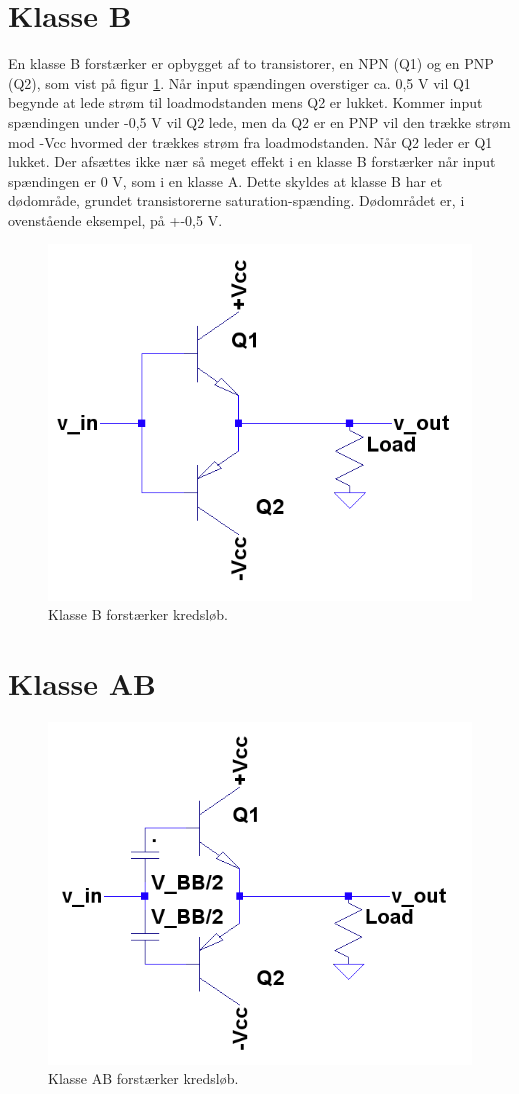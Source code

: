 \section{Klasse B}
En klasse B forstærker er opbygget af to transistorer, en NPN (Q1) og en PNP (Q2), som vist på figur \ref{fig:classb}. Når input spændingen overstiger ca. 0,5 V vil Q1 begynde at lede strøm til loadmodstanden mens Q2 er lukket. Kommer input spændingen under -0,5 V vil Q2 lede, men da Q2 er en PNP vil den trække strøm mod -Vcc hvormed der trækkes strøm fra loadmodstanden. Når Q2 leder er Q1 lukket. 
Der afsættes ikke nær så meget effekt i en klasse B forstærker når input spændingen er 0 V, som i en klasse A. Dette skyldes at klasse B har et dødområde, grundet transistorerne saturation-spænding. Dødområdet er, i ovenstående eksempel, på +-0,5 V. 

\begin{figure}[h]
\centering
\includegraphics[scale=.6]{klasser/classb.png}
\caption{Klasse B forstærker kredsløb.}
\label{fig:classb}
\end{figure}

\section{Klasse AB}
\begin{figure}[h]
\centering
\includegraphics[scale=.6]{klasser/classab.png}
\caption{Klasse AB forstærker kredsløb.}
\label{fig:classab}
\end{figure}
